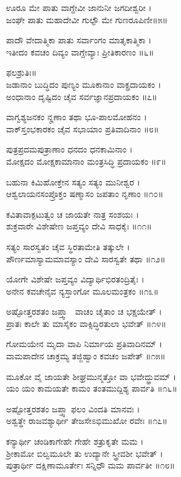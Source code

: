 ಊರೂ ಮೇ ಪಾತು ವಾಗ್ದೇವೀ ಜಾನುನೀ ಜಗದೀಶ್ವರೀ ।\\
ಜಂಘೇ ಪಾತು ಮಹಾದೇವೀ ಗುಲ್ಫೌ ಮೇ ಗುಣರೂಪಿಣೀ॥೫॥

ಪಾದೌ ವೇದಾತ್ಮಿಕಾ ಪಾತು ಸರ್ವಾಂಗಂ ಮಾತೃಕಾತ್ಮಿಕಾ ।\\
ಇತೀದಂ ಕವಚಂ ದಿವ್ಯಂ ವಾಗ್ದೇವ್ಯಾಃ ಪ್ರೀತಿಕಾರಣಂ ॥೬॥

ಫಲಶ್ರುತಿಃ॥\\
ಜಡಾನಾಂ ಬುದ್ಧಿದಂ ಪುಣ್ಯಂ ಮೂಕಾನಾಂ ವಾಕ್ಪ್ರದಾಯಕಂ ।\\
ಅಂಧಾನಾಂ ದೃಷ್ಟಿದಂ ಚೈವ ಸರ್ವಜ್ಞಾನಪ್ರದಾಯಕಂ ॥೭॥

ವಾಗ್ವಶ್ಯಜನಕಂ ನೄಣಾಂ ತಥಾ ಭೂ-ಪಾಲಮೋಹನಂ ।\\
ವಾಕ್‌ಸ್ತಂಭಕಾರಕಂ ಚೈವ ಸಭಾಯಾಂ ಪ್ರತಿವಾದಿನಾಂ ॥೮॥

ಪುತ್ರಪ್ರದಮಪುತ್ರಾಣಾಂ ಧನದಂ ಧನಕಾಮಿನಾಂ ।\\
ಮೋಕ್ಷದಂ ಮೋಕ್ಷಕಾಮಾನಾಂ ಮಂತ್ರಸಿದ್ಧಿ ಪ್ರದಾಯಕಂ ॥೯॥

ಬಹುನಾ ಕಿಮಿಹೋಕ್ತೇನ ಸತ್ಯಂ ಸತ್ಯಂ ಮುನೀಶ್ವರ ।\\
ಆಶ್ವಲಾಯನಸಂಪ್ರೊಕ್ತಂ ಷಣ್ಮಾಸಂ ಜಪತಾಂ ನೃಣಾಂ ॥೧೦॥

ಕವಿತಾವಾಕ್ಪಟುತ್ವಂ ಚ ಜಾಯತೇ ನಾತ್ರ ಸಂಶಯಃ ।\\
ಶುಕ್ರವಾರೇ ವಿಶೇಷೇಣ ಜಪ್ತವ್ಯಂ ದೇವಿ ಸಾಧಕೈಃ ॥೧೧॥

ಸತ್ಯಂ ಸಾರಸ್ವತಂ ಚೈವ ಸ್ಥಿರತಾಮೇತಿ ತತ್ಕುಲೇ ।\\
ಪೌರ್ಣಮಾಸ್ಯಾಮಮಾವಸ್ಯಾಂ ದೇವಿ ಸಾರಸ್ವತೇ ತಥಾ ॥೧೨॥

ಯೋಗೇ ವಿಶೇಷೇ ಜಪ್ತವ್ಯಂ ವಿದ್ಯಾರ್ಥಿಭಿರತಂದ್ರಿತೈಃ ।\\
ಅನೇನ ಕವಚೇನೈವ ನ್ಯಸ್ತಾಂಗೋ ಮೂಲಮಂತ್ರಕಂ ॥೧೩॥

ಅಷ್ಟೋತ್ತರಶತಂ ಜಪ್ತ್ವಾ  ವಾಚಂ ಚೈತಾಂ ಚ ಭಕ್ಷಯೇತ್ ।\\
ಪ್ರಾತಃ ಕಾಲೇ ತು ಮಾಸೈಕಂ ವಾಕ್ಸಿದ್ಧಿರತುಲಾ ಭವೇತ್ ॥೧೪॥

ಗೋಮಯೇನ ಮೃದಾ ವಾಪಿ ನಿರ್ಮಾಯ ಪ್ರತಿವಾದಿನಮ್ ।\\
ವಾಮಪಾದೇನ ಚಾಕ್ರಮ್ಯ ತಜ್ಜಿಹ್ವಾಂ ಕವಚಂ ಜಪೇತ್ ॥೧೫॥

ಮೂಕೋ ವೈ ಜಾಯತೇ ಶೀಘ್ರಮುನ್ಮತ್ತೋ ವಾ ಭವೇದ್ಧ್ರುವಮ್ ।\\
ಯಂ ಯಂ ಕಾಮಯತೇ ಕಾಮಂ ತಂತಮುದ್ದಿಶ್ಯ ಪಾರ್ವತಿ ॥೧೬॥

ಅಷ್ಟೋತ್ತರಶತಂ ಜಪ್ತ್ವಾ ಫಲಂ ವಿಂದತಿ ಮಾನವಃ ।\\
ಅಶ್ವತ್ಥೇ ರಾಜವಶ್ಯಾರ್ಥೀ ತೇಜಸೇಽಭಿಮುಖೋ ರವೇಃ ॥೧೭॥

ಕನ್ಯಾರ್ಥೀ ಚಂಡಿಕಾಗೇಹೇ ಗೇಹೇ ಶತ್ರುಕೃತೇ ಮಮ ।\\
ಶ್ರೀಕಾಮೋ ಬಿಲ್ವಮೂಲೇ ತು ಉದ್ಯಾನೇ ಸ್ತ್ರೀವಶೀ ಭವೇತ್ ।\\
ಪುತ್ರಾರ್ಥೀ ದಕ್ಷಿಣಾಮೂರ್ತೇಃ ಸನ್ನಿಧೌ ಮಮ ಪಾರ್ವತೀ ॥೧೮॥
